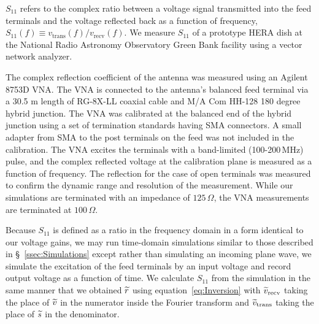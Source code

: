 \documentclass[twocolumn]{emulateapj}
\begin{document}
$S_{11}$ refers to the complex ratio between a voltage signal transmitted into the feed terminals and the voltage reflected back as a function of frequency, $ S_{11}(f) \equiv v_\text{trans}(f)/v_\text{recv}(f) $. We measure $S_{11}$ of a prototype HERA dish at the National Radio Astronomy Observatory Green Bank facility using a vector network analyzer. 

The complex reflection coefficient of the antenna was measured using an Agilent 8753D VNA. The VNA is connected to the antenna's balanced feed terminal via a 30.5 m length of RG-8X-LL coaxial cable and M/A Com HH-128 180 degree hybrid junction.  The VNA was calibrated at the balanced end of the hybrid junction using a set of termination standards having SMA connectors.  A small adapter from SMA to the post terminals on the feed was not included in the calibration.  The VNA excites the terminals with a band-limited (100-200\,MHz) pulse, and the complex reflected voltage at the calibration plane is measured as a function of frequency.  The reflection for the case of open terminals was measured to confirm the dynamic range and resolution of the measurement. While our simulations are terminated with an impedance of $125$\,$\Omega$, the VNA measurements are terminated at $100$\,$\Omega$. 

Because $S_{11}$ is defined as a ratio in the frequency domain in a form identical to our voltage gains, we may run time-domain simulations similar to those described in \S~\ref{ssec:Simulations} except rather than simulating an incoming plane wave, we simulate the excitation of the feed terminals by an input voltage and record output voltage as a function of time. We calculate $S_{11}$ from the simulation in the same manner that we obtained ${\widetilde{r}}$ using equation~\ref{eq:Inversion} with ${\widetilde{v}}_\text{recv}$ taking the place of ${\widetilde{v}}$ in the numerator inside the Fourier transform and ${\widetilde{v}}_\text{trans}$ taking the place of ${\widetilde{s}}$ in the denominator. 
\end{document}
